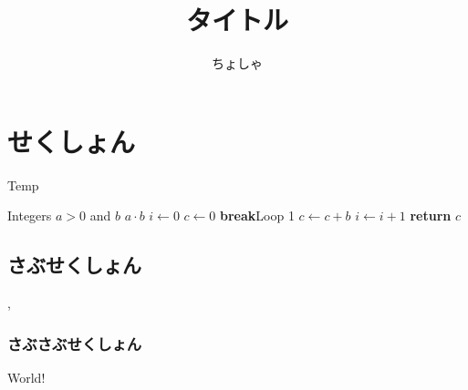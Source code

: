 \documentclass[11pt,a4paper,titlepage]{jarticle}
\newcommand{\Break}{\State \textbf{break}}
\begin{document}
\title{タイトル}
\author{ちょしゃ}
\maketitle

\tableofcontents
\newpage
{}

\section{せくしょん}

\begin{algorithm}{}
\caption{Temp}
\begin{algorithmic}[1]
\Require Integers $a >0$ and $b$
\Ensure $a\cdot b$
\State $i\leftarrow0$
\State $c \leftarrow 0$
        \Break Loop 1
    \EndIf
    \State $c \leftarrow c + b$
    \State $i \leftarrow i + 1$
\EndLoop
\State \textbf{return} $c$
\end{algorithmic}
\end{algorithm}


\subsection{さぶせくしょん}
,
\subsubsection{さぶさぶせくしょん}
World!
\end{document}
